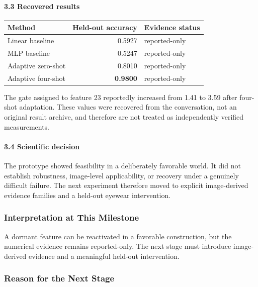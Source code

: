 \documentclass[
  10pt,
]{article}
\begin{document}
\hypertarget{recovered-results}{%
\paragraph{3.3 Recovered results}\label{recovered-results}}

\begin{longtable}[]{@{}lrl@{}}
\toprule\noalign{}
Method & Held-out accuracy & Evidence status \\
\midrule\noalign{}
\endhead
\bottomrule\noalign{}
\endlastfoot
Linear baseline & 0.5927 & reported-only \\
MLP baseline & 0.5247 & reported-only \\
Adaptive zero-shot & 0.8010 & reported-only \\
Adaptive four-shot & \textbf{0.9800} & reported-only \\
\end{longtable}

The gate assigned to feature 23 reportedly increased from 1.41 to 3.59
after four-shot adaptation. These values were recovered from the
conversation, not an original result archive, and therefore are not
treated as independently verified measurements.

\hypertarget{scientific-decision}{%
\paragraph{3.4 Scientific decision}\label{scientific-decision}}

The prototype showed feasibility in a deliberately favorable world. It
did not establish robustness, image-level applicability, or recovery
under a genuinely difficult failure. The next experiment therefore moved
to explicit image-derived evidence families and a held-out eyewear
intervention.

\hypertarget{interpretation-at-this-milestone}{%
\subsubsection{Interpretation at This
Milestone}\label{interpretation-at-this-milestone}}

A dormant feature can be reactivated in a favorable construction, but
the numerical evidence remains reported-only. The next stage must
introduce image-derived evidence and a meaningful held-out intervention.

\hypertarget{reason-for-the-next-stage}{%
\subsubsection{Reason for the Next
Stage}\label{reason-for-the-next-stage}}
\end{document}
